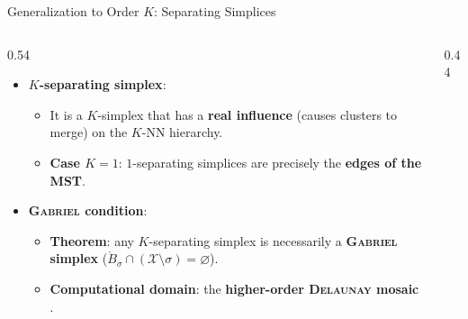 \documentclass[A4,svgnames,9pt,aspectratio=169]{beamer}
\begin{document}
\begin{frame}{Generalization to Order $K$: Separating Simplices}
    \begin{columns}[c, onlytextwidth]
        \begin{column}{0.54\textwidth}
            \begin{itemize}
                \setlength{\itemsep}{10pt}
                \item \textbf{$K$-separating simplex}:
                \begin{itemize}
                    \item It is a $K$-simplex that has a \textbf{real influence} (causes clusters to merge) on the $K$-NN hierarchy.
                    \item \textbf{Case $K=1$}: $1$-separating simplices are precisely the \textbf{edges of the MST}.
                \end{itemize}
                \item \textbf{\textsc{Gabriel} condition}:
                \begin{itemize}
                    \item \textbf{Theorem}: any $K$-separating simplex is necessarily a \textbf{\textsc{Gabriel} simplex} ($\mathring{B}_\sigma \cap (\mathcal{X} \setminus \sigma) = \varnothing$).
                    \item \textbf{Computational domain}: the \textbf{higher-order \textsc{Delaunay} mosaic} \cite{osangEdelsbrunner2023algorithm}.
                \end{itemize}
            \end{itemize}
        \end{column}
        
        \begin{column}{0.44\textwidth}
            \begin{center}
\end{center}
\end{column}
\end{columns}
\end{frame}
\end{document}
